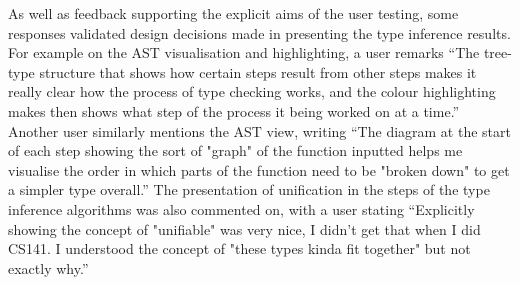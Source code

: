 \documentclass[a4paper,fleqn,oneside,12pt]{report}
\begin{document}
As well as feedback supporting the explicit aims of the user testing, some responses validated design decisions made in presenting the type inference results. For example on the AST visualisation and highlighting, a user remarks “The tree-type structure that shows how certain steps result from other steps makes it really clear how the process of type checking works, and the colour highlighting makes then shows what step of the process it being worked on at a time.” Another user similarly mentions the AST view, writing “The diagram at the start of each step showing the sort of "graph" of the function inputted helps me visualise the order in which parts of the function need to be "broken down" to get a simpler type overall.” The presentation of unification in the steps of the type inference algorithms was also commented on, with a user stating “Explicitly showing the concept of "unifiable" was very nice, I didn't get that when I did CS141. I understood the concept of "these types kinda fit together" but not exactly why.”
\end{document}
